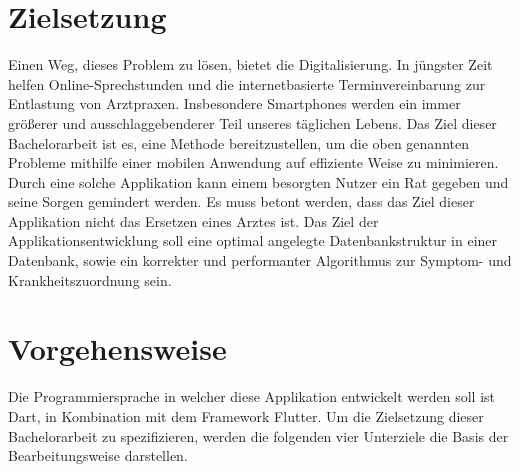 \section{Zielsetzung}
Einen Weg, dieses Problem zu lösen, bietet die Digitalisierung. In jüngster Zeit helfen Online-Sprechstunden und die internetbasierte Terminvereinbarung zur Entlastung von Arztpraxen. 
Insbesondere Smartphones werden ein immer größerer und ausschlaggebenderer Teil unseres täglichen Lebens. Das Ziel dieser Bachelorarbeit ist es, eine Methode bereitzustellen, um die oben genannten Probleme mithilfe einer mobilen Anwendung auf effiziente Weise zu minimieren. Durch eine solche Applikation kann einem besorgten Nutzer ein Rat gegeben und seine Sorgen gemindert werden. Es muss betont werden, dass das Ziel dieser Applikation nicht das Ersetzen eines Arztes ist.
Das Ziel der Applikationsentwicklung soll eine optimal angelegte Datenbankstruktur in einer Datenbank, sowie ein korrekter und performanter Algorithmus zur Symptom- und Krankheitszuordnung sein.

\section{Vorgehensweise}
Die Programmiersprache in welcher diese Applikation entwickelt werden soll ist Dart, in Kombination mit dem Framework Flutter. Um die Zielsetzung dieser Bachelorarbeit zu spezifizieren, werden die folgenden vier Unterziele die Basis der Bearbeitungsweise darstellen.

